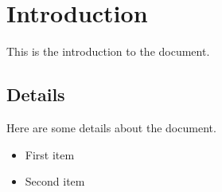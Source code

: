 \documentclass{article}
\begin{document}
\section{Introduction}
This is the introduction to the document.

\subsection{Details}
Here are some details about the document.


\begin{itemize}
    \item First item
    \item Second item
\end{itemize}
\end{document}
